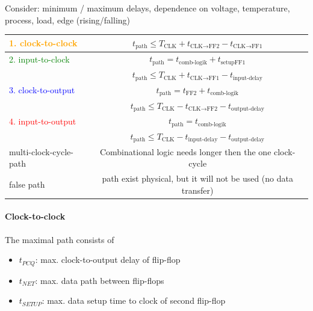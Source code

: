 Consider: minimum / maximum delays, dependence on voltage, temperature, process, load, edge (rising/falling)

\begin{table}[!h]
	\centering
	\begin{tabular}{|l|c|}
		\hline
		\textcolor{orange}{1. clock-to-clock} & $t_{\text{path}} \leq T_{\text{CLK}} + t_{\text{CLK} \rightarrow \text{FF2}} - t_{\text{CLK} \rightarrow \text{FF1}}$ \\ \hline
		\textcolor{green}{2. input-to-clock}  &                           $t_{\text{path}} = t_{\text{comb-logik}} + t_{\text{setupFF1}} $                            \\
		                                      &        $t_{\text{path}} \leq T_{\text{CLK}} + t_{\text{CLK} \rightarrow \text{FF1}} - t_{\text{input-delay}}$         \\ \hline
		\textcolor{blue}{3. clock-to-output}  &                              $t_{\text{path}} = t_{\text{FF2}} + t_{\text{comb-logik}}$                               \\
		                                      &        $t_{\text{path}} \leq T_{\text{CLK}} - t_{\text{CLK} \rightarrow \text{FF2}} - t_{\text{output-delay}}$        \\ \hline
		\textcolor{red}{4. input-to-output}   &                                      $t_{\text{path}} = t_{\text{comb-logik}} $                                       \\
		                                      &               $t_{\text{path}} \leq T_{\text{CLK}} - t_{\text{input-delay}} - t_{\text{output-delay}} $               \\ \hline
		multi-clock-cycle-path                &                               Combinational logic needs longer then the one clock-cycle                               \\ \hline
		false path                            &                            path exist physical, but it will not be used (no data transfer)                            \\ \hline
	\end{tabular}
\end{table}

\paragraph{Clock-to-clock}The maximal path consists of 
\begin{itemize}
    \item $t_{PCQ}$: max. clock-to-output delay of flip-flop
    \item $t_{NET}$: max. data path between flip-flops
    \item $t_{SETUP}$: max. data setup time to clock of second flip-flop 
\end{itemize}

